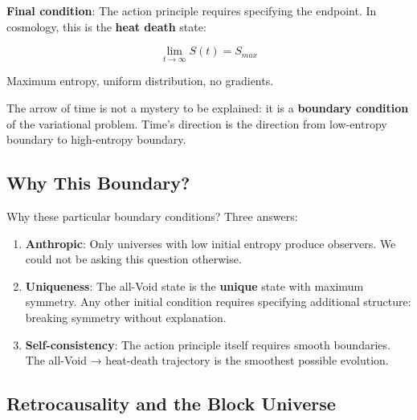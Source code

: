 \documentclass[
  11pt,
  letterpaper,
  twoside,
  openright]{book}
\begin{document}
\textbf{Final condition}: The action principle requires specifying the
endpoint. In cosmology, this is the \textbf{heat death} state:

\[\lim_{t \to \infty} S(t) = S_{max}\]

Maximum entropy, uniform distribution, no gradients.

\begin{tcolorbox}[enhanced jigsaw, coltitle=black, colbacktitle=quarto-callout-important-color!10!white, toprule=.15mm, colframe=quarto-callout-important-color-frame, arc=.35mm, opacityback=0, bottomtitle=1mm, toptitle=1mm, breakable, colback=white, titlerule=0mm, opacitybacktitle=0.6, title=\textcolor{quarto-callout-important-color}{\faExclamation}\hspace{0.5em}{The Arrow is Geometric}, rightrule=.15mm, bottomrule=.15mm, leftrule=.75mm, left=2mm]

The arrow of time is not a mystery to be explained: it is a
\textbf{boundary condition} of the variational problem. Time's direction
is the direction from low-entropy boundary to high-entropy boundary.

\end{tcolorbox}

\subsection{Why This Boundary?}\label{why-this-boundary}

Why these particular boundary conditions? Three answers:

\begin{enumerate}
\def\labelenumi{\arabic{enumi}.}
\item
  \textbf{Anthropic}: Only universes with low initial entropy produce
  observers. We could not be asking this question otherwise.
\item
  \textbf{Uniqueness}: The all-Void state is the \textbf{unique} state
  with maximum symmetry. Any other initial condition requires specifying
  additional structure: breaking symmetry without explanation.
\item
  \textbf{Self-consistency}: The action principle itself requires smooth
  boundaries. The all-Void → heat-death trajectory is the smoothest
  possible evolution.
\end{enumerate}

\subsection{Retrocausality and the Block
Universe}\label{retrocausality-and-the-block-universe}
\end{document}
